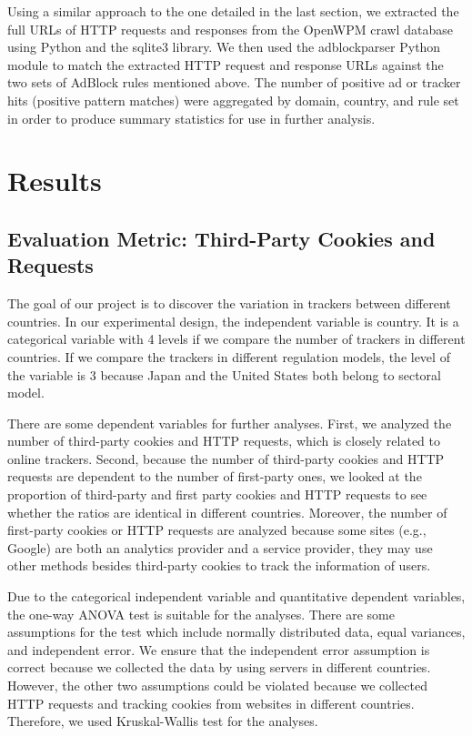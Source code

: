 \documentclass[journal]{IEEEtran}
\begin{document}
Using a similar approach to the one detailed in the last section, we extracted the full URLs of HTTP requests and responses from the OpenWPM crawl database using Python and the sqlite3 library. We then used the adblockparser \cite{adblockparser} Python module to match the extracted HTTP request and response URLs against the two sets of AdBlock rules mentioned above. The number of positive ad or tracker hits (positive pattern matches) were aggregated by domain, country, and rule set in order to produce summary statistics for use in further analysis.



\section{Results}
\subsection{Evaluation Metric: Third-Party Cookies and Requests}
The goal of our project is to discover the variation in trackers between different countries.  In our experimental design, the independent variable is country. It is a categorical variable with 4 levels if we compare the number of trackers in different countries. If we compare the trackers in different regulation models, the level of the variable is 3 because Japan and the United States both belong to sectoral model. 

There are some dependent variables for further analyses. First, we analyzed the number of third-party cookies and HTTP requests, which is closely related to online trackers. Second, because the number of third-party cookies and HTTP requests are dependent to the number of first-party ones, we looked at the proportion of third-party and first party cookies and HTTP requests to see whether the ratios are identical in different countries. Moreover, the number of first-party cookies or HTTP requests are analyzed because some sites (e.g., Google) are both an analytics provider and a service provider, they may use other methods besides third-party cookies to track the information of users. 

Due to the categorical independent variable and quantitative dependent variables, the one-way ANOVA test is suitable for the analyses. There are some assumptions for the test which include normally distributed data, equal variances, and independent error. We ensure that the independent error assumption is correct because we collected the data by using servers in different countries. However, the other two assumptions could be violated because we collected HTTP requests and tracking cookies from websites in different countries. Therefore, we used Kruskal-Wallis test for the analyses. 
\end{document}
